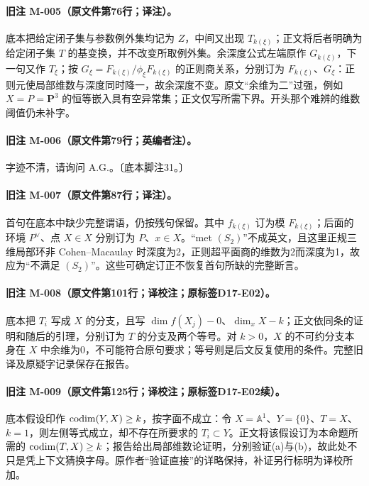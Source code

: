 \paragraph{旧注 M-005（原文件第76行；译注）。}
底本把给定闭子集与参数例外集均记为 $Z$，中间又出现 $T_{k(\xi)}$；正文将后者明确为给定闭子集 $T$ 的基变换，并不改变所取例外集。余深度公式左端原作 $G_{k(\xi)}$，下一句又作 $T_\xi$；按 $G_\xi=F_{k(\xi)}/\phi_\xi F_{k(\xi)}$ 的正则商关系，分别订为 $F_{k(\xi)}$、$G_\xi$：正则元使局部维数与深度同时降一，故余深度不变。原文“余维为二”过强，例如 $X=P=\mathbf P^3$ 的恒等嵌入具有空异常集；正文仅写所需下界。开头那个难辨的维数阈值仍未补字。

\paragraph{旧注 M-006（原文件第79行；英编者注）。}
字迹不清，请询问 A.G.。〔底本脚注31。〕

\paragraph{旧注 M-007（原文件第87行；译注）。}
首句在底本中缺少完整谓语，仍按残句保留。其中 $f_{k(\xi)}$ 订为模 $F_{k(\xi)}$；后面的环境 $P^\vee$、点 $X\in X$ 分别订为 $P$、$x\in X$。“met $(S_2)$”不成英文，且这里正规三维局部环非 Cohen--Macaulay 时深度为2，正则超平面商的维数为2而深度为1，故应为“不满足 $(S_2)$”。这些可确定订正不恢复首句所缺的完整断言。

\paragraph{旧注 M-008（原文件第101行；译校注；原标签D17-E02）。}
底本把 $T_i$ 写成 $X$ 的分支，且写 $\dim f(X_j)-0$、$\dim_xX-k$；正文依同条的证明和随后的引理，分别订为 $T$ 的分支及两个等号。对 $k>0$，$X$ 的不可约分支本身在 $X$ 中余维为0，不可能符合原句要求；等号则是后文反复使用的条件。完整旧译及原疑字记录保存在报告。

\paragraph{旧注 M-009（原文件第125行；译校注；原标签D17-E02续）。}
底本假设印作 $\operatorname{codim}(Y,X)\geq k$，按字面不成立：令 $X=\mathbb A^1$、$Y=\{0\}$、$T=X$、$k=1$，则左侧等式成立，却不存在所要求的 $T_i\subset Y$。正文将该假设订为本命题所需的 $\operatorname{codim}(T,X)\geq k$；报告给出局部维数论证明，分别验证(a)与(b)，故此处不只是凭上下文猜换字母。原作者“验证直接”的详略保持，补证另行标明为译校所加。

